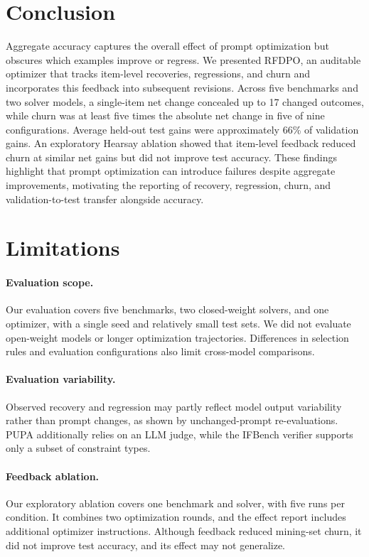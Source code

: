 \documentclass[10pt]{article} %
\begin{document}
\section{Conclusion}
Aggregate accuracy captures the overall effect of prompt optimization but obscures which examples improve or regress. We presented RFDPO, an auditable optimizer that tracks item-level recoveries, regressions, and churn and incorporates this feedback into subsequent revisions. Across five benchmarks and two solver models, a single-item net change concealed up to 17 changed outcomes, while churn was at least five times the absolute net change in five of nine configurations. Average held-out test gains were approximately 66\% of validation gains. An exploratory Hearsay ablation showed that item-level feedback reduced churn at similar net gains but did not improve test accuracy. These findings highlight that prompt optimization can introduce failures despite aggregate improvements, motivating the reporting of recovery, regression, churn, and validation-to-test transfer alongside accuracy.

\section*{Limitations}
\label{sec:limitations}

\paragraph{Evaluation scope.}
Our evaluation covers five benchmarks, two closed-weight solvers, and one optimizer, with a single seed and relatively small test sets. We did not evaluate open-weight models or longer optimization trajectories. Differences in selection rules and evaluation configurations also limit cross-model comparisons.

\paragraph{Evaluation variability.}
Observed recovery and regression may partly reflect model output variability rather than prompt changes, as shown by unchanged-prompt re-evaluations. PUPA additionally relies on an LLM judge, while the IFBench verifier supports only a subset of constraint types.

\paragraph{Feedback ablation.}
Our exploratory ablation covers one benchmark and solver, with five runs per condition. It combines two optimization rounds, and the effect report includes additional optimizer instructions. Although feedback reduced mining-set churn, it did not improve test accuracy, and its effect may not generalize.
\end{document}
